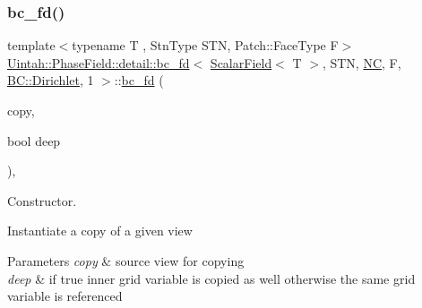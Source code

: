 \subsubsection{\texorpdfstring{bc\+\_\+fd()}{bc\_fd()}\hspace{0.1cm}{\footnotesize\ttfamily [1/3]}}
{\footnotesize\ttfamily template$<$typename T , Stn\+Type S\+TN, Patch\+::\+Face\+Type F$>$ \\
\hyperlink{classUintah_1_1PhaseField_1_1detail_1_1bc__fd}{Uintah\+::\+Phase\+Field\+::detail\+::bc\+\_\+fd}$<$ \hyperlink{structUintah_1_1PhaseField_1_1ScalarField}{Scalar\+Field}$<$ T $>$, S\+TN, \hyperlink{namespaceUintah_1_1PhaseField_a33d355affda78a83f45755ba8388cedda77924170fe82bfd58b74ca3e44139718}{NC}, F, \hyperlink{namespaceUintah_1_1PhaseField_a148fba372aa3be96fd6eede7a2fa10b5abac152b762896edff34ed668ae1a546f}{B\+C\+::\+Dirichlet}, 1 $>$\+::\hyperlink{classUintah_1_1PhaseField_1_1detail_1_1bc__fd}{bc\+\_\+fd} (\begin{DoxyParamCaption}\item[{const \hyperlink{classUintah_1_1PhaseField_1_1detail_1_1bc__fd}{bc\+\_\+fd}$<$ \hyperlink{structUintah_1_1PhaseField_1_1ScalarField}{Scalar\+Field}$<$ T $>$, S\+TN, \hyperlink{namespaceUintah_1_1PhaseField_a33d355affda78a83f45755ba8388cedda77924170fe82bfd58b74ca3e44139718}{NC}, F, \hyperlink{namespaceUintah_1_1PhaseField_a148fba372aa3be96fd6eede7a2fa10b5abac152b762896edff34ed668ae1a546f}{B\+C\+::\+Dirichlet}, 1 $>$ $\ast$}]{copy,  }\item[{bool}]{deep }\end{DoxyParamCaption})\hspace{0.3cm}{\ttfamily [inline]}, {\ttfamily [protected]}}



Constructor. 

Instantiate a copy of a given view


\begin{DoxyParams}{Parameters}
{\em copy} & source view for copying \\
\hline
{\em deep} & if true inner grid variable is copied as well otherwise the same grid variable is referenced \\
\hline
\end{DoxyParams}
\mbox{\label{classUintah_1_1PhaseField_1_1detail_1_1bc__fd_3_01ScalarField_3_01T_01_4_00_01STN_00_01NC_00_01Fc8a6e28ffa258d282d0a921216b0ed9f_aadba23a90178025c8425a5c7db96579d}} 
